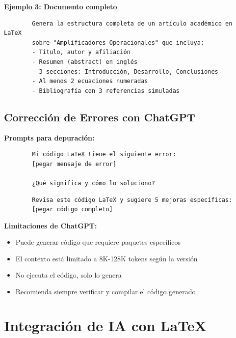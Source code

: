 \documentclass[11pt,letterpaper]{article}
\begin{document}
\begin{cajaejemplo}
	\textbf{Ejemplo 3: Documento completo}
	\begin{verbatim}
		Genera la estructura completa de un artículo académico en LaTeX 
		sobre "Amplificadores Operacionales" que incluya:
		- Título, autor y afiliación
		- Resumen (abstract) en inglés
		- 3 secciones: Introducción, Desarrollo, Conclusiones
		- Al menos 2 ecuaciones numeradas
		- Bibliografía con 3 referencias simuladas
	\end{verbatim}
\end{cajaejemplo}

\subsection{Corrección de Errores con ChatGPT}

\begin{cajaiaclaro}
	\textbf{Prompts para depuración:}
	\begin{verbatim}
		Mi código LaTeX tiene el siguiente error:
		[pegar mensaje de error]
		
		¿Qué significa y cómo lo soluciono?
	\end{verbatim}
	
	\begin{verbatim}
		Revisa este código LaTeX y sugiere 5 mejoras específicas:
		[pegar código completo]
	\end{verbatim}
\end{cajaiaclaro}

\begin{cajaadvertencia}
	\textbf{Limitaciones de ChatGPT:}
	\begin{itemize}
		\item Puede generar código que requiere paquetes específicos
		\item El contexto está limitado a 8K-128K tokens según la versión
		\item No ejecuta el código, solo lo genera
		\item Recomienda siempre verificar y compilar el código generado
	\end{itemize}
\end{cajaadvertencia}

\newpage


\section{Integración de IA con \LaTeX}
\end{document}
